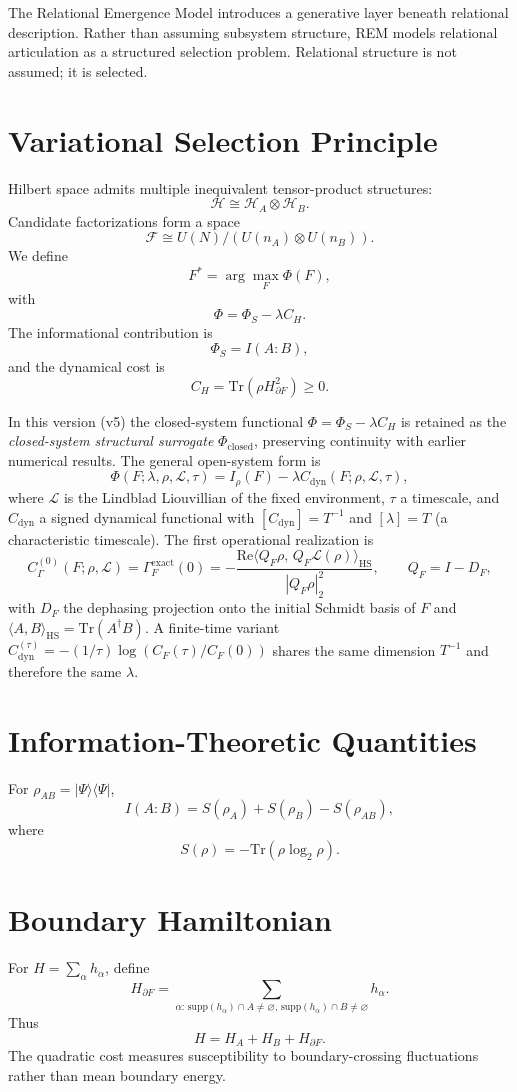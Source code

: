 \documentclass[11pt]{article}
\begin{document}
The Relational Emergence Model introduces a generative layer beneath relational description. Rather than assuming subsystem structure, REM models relational articulation as a structured selection problem. Relational structure is not assumed; it is selected.

\section{Variational Selection Principle}
Hilbert space admits multiple inequivalent tensor-product structures:
\[
\mathcal H \cong \mathcal H_A \otimes \mathcal H_B.
\]
Candidate factorizations form a space
\[
\mathcal F\cong U(N)/(U(n_A)\otimes U(n_B)).
\]
We define
\[
F^*=\arg\max_F\Phi(F),
\]
with
\[
\Phi=\Phi_S-\lambda C_H.
\]
The informational contribution is
\[
\Phi_S=I(A:B),
\]
and the dynamical cost is
\[
C_H=\mathrm{Tr}(\rho H_{\partial F}^2)\geq0.
\]

In this version (v5) the closed-system functional $\Phi=\Phi_S-\lambda C_H$ is retained as the \emph{closed-system structural surrogate} $\Phi_{\mathrm{closed}}$, preserving continuity with earlier numerical results. The general open-system form is
\[
\Phi(F;\lambda,\rho,\mathcal L,\tau)=I_\rho(F)-\lambda C_{\mathrm{dyn}}(F;\rho,\mathcal L,\tau),
\]
where $\mathcal L$ is the Lindblad Liouvillian of the fixed environment, $\tau$ a timescale, and $C_{\mathrm{dyn}}$ a signed dynamical functional with $[C_{\mathrm{dyn}}]=T^{-1}$ and $[\lambda]=T$ (a characteristic timescale). The first operational realization is
\[
C_\Gamma^{(0)}(F;\rho,\mathcal L)=\Gamma_F^{\mathrm{exact}}(0)
=-\frac{\mathrm{Re}\langle Q_F\rho,\,Q_F\mathcal L(\rho)\rangle_{\mathrm{HS}}}{|Q_F\rho|_2^2},
\qquad
Q_F=I-D_F,
\]
with $D_F$ the dephasing projection onto the initial Schmidt basis of $F$ and $\langle A,B\rangle_{\mathrm{HS}}=\mathrm{Tr}(A^\dagger B)$. A finite-time variant $C_{\mathrm{dyn}}^{(\tau)}=-(1/\tau)\log(C_F(\tau)/C_F(0))$ shares the same dimension $T^{-1}$ and therefore the same $\lambda$.

\section{Information-Theoretic Quantities}
For $\rho_{AB}=|\Psi\rangle\langle\Psi|$,
\[
I(A:B)=S(\rho_A)+S(\rho_B)-S(\rho_{AB}),
\]
where
\[
S(\rho)=-\mathrm{Tr}(\rho\log_2\rho).
\]

\section{Boundary Hamiltonian}
For $H=\sum_\alpha h_\alpha$, define
\[
H_{\partial F}=\sum_{\alpha:\,\mathrm{supp}(h_\alpha)\cap A\neq\varnothing,\,
\mathrm{supp}(h_\alpha)\cap B\neq\varnothing} h_\alpha.
\]
Thus
\[
H=H_A+H_B+H_{\partial F}.
\]
The quadratic cost measures susceptibility to boundary-crossing fluctuations rather than mean boundary energy.
\end{document}
